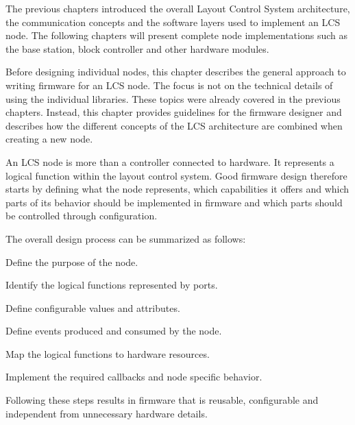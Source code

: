 %

The previous chapters introduced the overall Layout Control System architecture,
the communication concepts and the software layers used to implement an LCS
node. The following chapters will present complete node implementations such as
the base station, block controller and other hardware modules.

Before designing individual nodes, this chapter describes the general approach
to writing firmware for an LCS node. The focus is not on the technical details of
using the individual libraries. These topics were already covered in the
previous chapters. Instead, this chapter provides guidelines for the firmware
designer and describes how the different concepts of the LCS architecture are
combined when creating a new node.

An LCS node is more than a controller connected to hardware. It represents a
logical function within the layout control system. Good firmware design
therefore starts by defining what the node represents, which capabilities it
offers and which parts of its behavior should be implemented in firmware and
which parts should be controlled through configuration.

The overall design process can be summarized as follows:

\begin{smallGapItemize}
    \item Define the purpose of the node.
    \item Identify the logical functions represented by ports.
    \item Define configurable values and attributes.
    \item Define events produced and consumed by the node.
    \item Map the logical functions to hardware resources.
    \item Implement the required callbacks and node specific behavior.
\end{smallGapItemize}

Following these steps results in firmware that is reusable, configurable and
independent from unnecessary hardware details.


